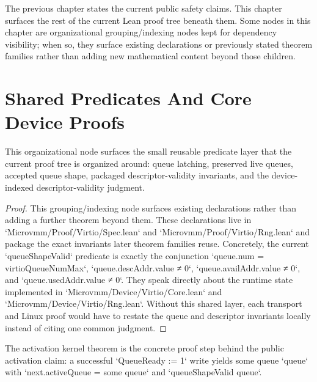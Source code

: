 The previous chapter states the current public safety claims.
This chapter surfaces the rest of the current Lean proof tree beneath them.
Some nodes in this chapter are organizational grouping/indexing nodes kept for dependency visibility; when so, they surface existing declarations or previously stated theorem families rather than adding new mathematical content beyond those children.

\section{Shared Predicates And Core Device Proofs}

\begin{theorem}
\label{thm:spec-predicates}
\leanok
This organizational node surfaces the small reusable predicate layer that the current proof tree is organized around: queue latching, preserved live queues, accepted queue shape, packaged descriptor-validity invariants, and the device-indexed descriptor-validity judgment.
\end{theorem}

\begin{proof}
\leanok
This grouping/indexing node surfaces existing declarations rather than adding a further theorem beyond them.
These declarations live in `Microvmm/Proof/Virtio/Spec.lean` and `Microvmm/Proof/Virtio/Rng.lean` and package the exact invariants later theorem families reuse.
Concretely, the current `queueShapeValid` predicate is exactly the conjunction `queue.num = virtioQueueNumMax`, `queue.descAddr.value ≠ 0`, `queue.availAddr.value ≠ 0`, and `queue.usedAddr.value ≠ 0`.
They speak directly about the runtime state implemented in `Microvmm/Device/Virtio/Core.lean` and `Microvmm/Device/Virtio/Rng.lean`.
Without this shared layer, each transport and Linux proof would have to restate the queue and descriptor invariants locally instead of citing one common judgment.
\end{proof}

\begin{theorem}
\label{thm:activation-kernel}
\leanok
The activation kernel theorem is the concrete proof step behind the public activation claim: a successful `QueueReady := 1` write yields some queue `queue` with `next.activeQueue = some queue` and `queueShapeValid queue`.
\end{theorem}

